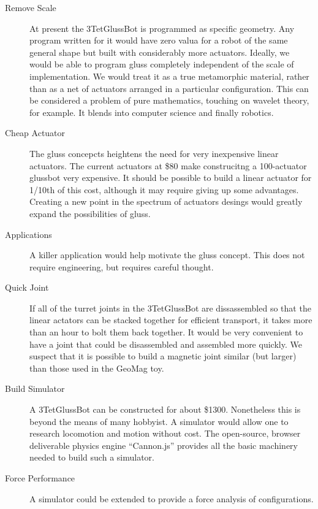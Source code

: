 \documentclass[12pt]{article}
\begin{document}
\begin{description}
\item [Remove Scale] At present the 3TetGlussBot is programmed as specific geometry. Any program
  written for it would have zero valua for a robot of the same general shape but built with considerably
  more actuators. Ideally, we would be able to program gluss completely independent of the scale
  of implementation. We would treat it as a true metamorphic material, rather than as a net of
  actuators arranged in a particular configuration. This can be considered a problem of pure
  mathematics, touching on wavelet theory, for example. It blends into computer science and
  finally robotics.
\item [Cheap Actuator] The gluss concepcts heightens the need for very inexpensive linear
  actuators. The current actuators at \$80 make construcitng a 100-actuator glussbot very expensive.
  It should be possible to build a linear actuator for 1/10th of this cost, although it may require
  giving up some advantages. Creating a new point in the spectrum of actuators desings would greatly
  expand the possibilities of gluss.
\item [Applications] A killer application would help motivate the gluss concept. This does not
  require engineering, but requires careful thought.
\item [Quick Joint] If all of the turret joints in the 3TetGlussBot are dissassembled so that
  the linear actators can be stacked together for efficient transport, it takes more than an hour
  to bolt them back together. It would be very convenient to have a joint that could be
  disassembled and assembled more quickly. We suspect that it is possible to build a magnetic
  joint similar (but larger) than those used in the GeoMag toy.
\item [Build Simulator] A 3TetGlussBot can be constructed for about \$1300. Nonetheless this
  is beyond the means of many hobbyist. A simulator would allow one to research locomotion and
  motion without cost. The open-source, browser deliverable physics engine ``Cannon.js''
  provides all the basic machinery needed to build such a simulator.
\item [Force Performance] A simulator could be extended to provide a force analysis of configurations.
  
  
\end{description}




% 
\end{document}
